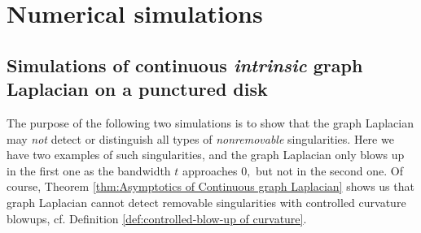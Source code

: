 \documentclass{amsart}
\theoremstyle{definition}
\theoremstyle{remark}
\newcommand{\0}{\boldsymbol{0}}
\begin{document}

\section{Numerical simulations}\label{scn:simulations}

\subsection{Simulations of continuous \textit{intrinsic} graph Laplacian on a punctured disk}


The purpose of the following two simulations is to show that the graph Laplacian may \textit{not} detect or distinguish all types of \textit{nonremovable} singularities. Here we have two examples of such singularities, and the graph Laplacian only blows up in the first one as the bandwidth $t$ approaches $0,$ but not in the second one. Of course, Theorem \ref{thm:Asymptotics of Continuous graph Laplacian} shows us that graph Laplacian cannot detect removable singularities with controlled curvature blowups, cf. Definition \ref{def:controlled-blow-up of curvature}.
\end{document}
